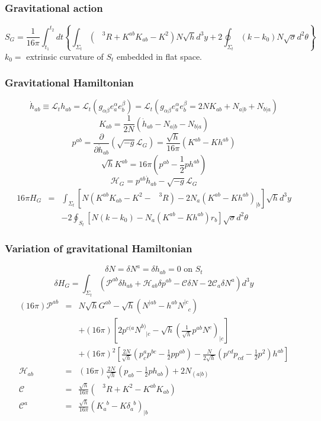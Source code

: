 \documentclass{article}
\begin{document}
\subsubsection{Gravitational action}
\[S_G = \frac{1}{16 \pi} \int_{t_1}^{t_2} dt \left\{ \int_{\Sigma_t} \left(\phantom{R}^3R + K^{ab}K_{ab} -K^2 \right) N \sqrt{h} d^3 y + 2\oint_{\Sigma_t}(k-k_0)N \sqrt{\sigma}d^2 \theta \right\} \]
$k_0 =$ extrinsic curvature of $S_t$ embedded in flat space. 

\subsubsection{Gravitational Hamiltonian}
\[\dot{h}_{ab} \equiv \mathcal{L}_t h_{ab} = \mathcal{L}_t (g_{\alpha \beta} e_a^{\alpha} e_b^{\beta}) =   \mathcal{L}_t (g_{\alpha \beta}e_a^{\alpha} e_b^{\beta} = 2NK_{ab} + N_{a|b} + N_{b|a})\]
\[K_{ab} = \frac{1}{2N} (\dot{h}_{ab} - N_{a|b} - N_{b|a})\]
\[p^{ab} = \frac{\partial}{\partial \dot{h}_{ab}} (\sqrt{-g} \mathcal{L}_G) = \frac{\sqrt{h}}{16\pi} (K^{ab} - K h^{ab})\]
\[\sqrt{h}K^{ab} = 16\pi (p^{ab} - \frac{1}{2}ph^{ab})\]
\[\mathcal{H}_G = p^{ab}\dot{h}_{ab} - \sqrt{-g} \mathcal{L}_G\]
\begin{eqnarray}
16\pi H_G &=& \int_{\Sigma_t} \left[ N(K^{ab}K_{ab} - K^2 - \phantom{R}^3R) - 2N_a(K^{ab} - Kh^{ab})_{|b} \right] \sqrt{h} d^3 y 
\nonumber \\
&\phantom{=}& -2\oint_{S_t} \left[ N(k-k_0) - N_a(K^{ab}-Kh^{ab})r_b \right] \sqrt{\sigma} d^2 \theta \nonumber
\end{eqnarray}

\subsubsection{Variation of gravitational Hamiltonian}
\[\delta N = \delta N^a = \delta h_{ab} = 0 \mbox{ on } S_t\]
\[\delta H_G = \int_{\Sigma_t} (\mathcal{P}^{ab} \delta h_{ab} + \mathcal{H}_{ab} \delta p^{ab} - \mathcal{C}\delta N - 2\mathcal{C}_a \delta N^a) d^3 y\]
\begin{eqnarray}
(16\pi)\mathcal{P}^{ab} &=&  N\sqrt{h}G^{ab} - \sqrt{h}(N^{|ab} - h^{ab} N^{|c}_{\phantom{|c}c}) \nonumber \\
&\phantom{=}& +(16\pi)[2p^{c(a}N^{b)}_{\phantom{b)}|c} - \sqrt{h}(\frac{1}{\sqrt{h}}p^{ab}N^c)_{|c}] \nonumber \\
&\phantom{=}& + (16\pi)^2 [\frac{2N}{\sqrt{h}} (p^a_c p^{bc} - \frac{1}{2} p p^{ab}) - \frac{N}{2\sqrt{h}}(p^{cd}p_{cd} - \frac{1}{2} p^2)h^{ab}] \nonumber \\
\mathcal{H}_{ab} &=& (16\pi) \frac{2N}{\sqrt{h}} (p_{ab} - \frac{1}{2}p h_{ab}) + 2N_{(a|b)} \nonumber \\
\mathcal{C} &=& \frac{\sqrt{h}}{16\pi} (\phantom{R}^3R + K^2 - K^{ab}K_{ab}) \nonumber \\
\mathcal{C}^a &=& \frac{\sqrt{h}}{16\pi} (K_a^{\phantom{a}b} - K \delta_a^{\phantom{a}b})_{|b} \nonumber 
\end{eqnarray}
\end{document}
